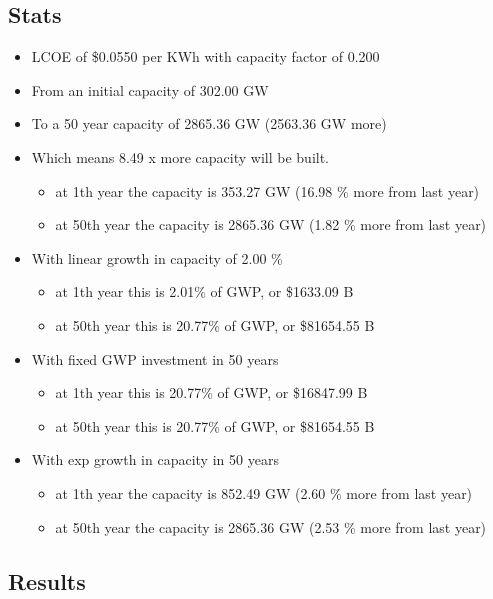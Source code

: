 \documentclass[11pt]{article}
\providecommand{\tightlist}{%
  \setlength{\itemsep}{0pt}\setlength{\parskip}{0pt}}
\begin{document}
\subsection{Stats}
\begin{itemize}
\tightlist
\item
  LCOE of \$0.0550 per KWh with capacity factor of 0.200
\item
  From an initial capacity of 302.00 GW
\item
  To a 50 year capacity of 2865.36 GW (2563.36 GW more)
\item
  Which means 8.49 x more capacity will be built.

  \begin{itemize}
  \tightlist
  \item
    at 1th year the capacity is 353.27 GW (16.98 \% more from last year)
  \item
    at 50th year the capacity is 2865.36 GW (1.82 \% more from last
    year)
  \end{itemize}
\item
  With linear growth in capacity of 2.00 \%

  \begin{itemize}
  \tightlist
  \item
    at 1th year this is 2.01\% of GWP, or \$1633.09 B
  \item
    at 50th year this is 20.77\% of GWP, or \$81654.55 B
  \end{itemize}
\item
  With fixed GWP investment in 50 years

  \begin{itemize}
  \tightlist
  \item
    at 1th year this is 20.77\% of GWP, or \$16847.99 B
  \item
    at 50th year this is 20.77\% of GWP, or \$81654.55 B
  \end{itemize}
\item
  With exp growth in capacity in 50 years

  \begin{itemize}
  \tightlist
  \item
    at 1th year the capacity is 852.49 GW (2.60 \% more from last year)
  \item
    at 50th year the capacity is 2865.36 GW (2.53 \% more from last
    year)
  \end{itemize}
\end{itemize}

\subsection{Results}
\end{document}
